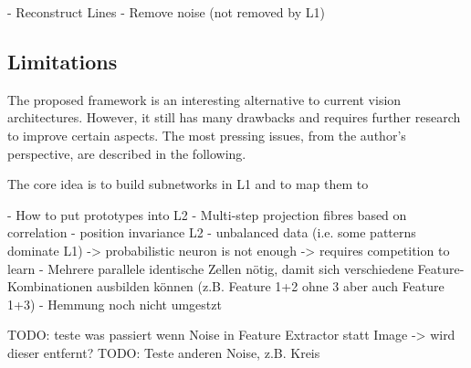 - Reconstruct Lines
- Remove noise (not removed by L1)



\subsection{Limitations}
The proposed framework is an interesting alternative to current vision architectures.
However, it still has many drawbacks and requires further research to improve certain aspects.
The most pressing issues, from the author's perspective, are described in the following.

The core idea is to build subnetworks in L1 and to map them to 


- How to put prototypes into L2
- Multi-step projection fibres based on correlation
- position invariance L2
- unbalanced data (i.e. some patterns dominate L1) -> probabilistic neuron is not enough -> requires competition to learn
- Mehrere parallele identische Zellen nötig, damit sich verschiedene Feature-Kombinationen ausbilden können (z.B. Feature 1+2 ohne 3 aber auch Feature 1+3)
- Hemmung noch nicht umgestzt




TODO: teste was passiert wenn Noise in Feature Extractor statt Image -> wird dieser entfernt?
TODO: Teste anderen Noise, z.B. Kreis






